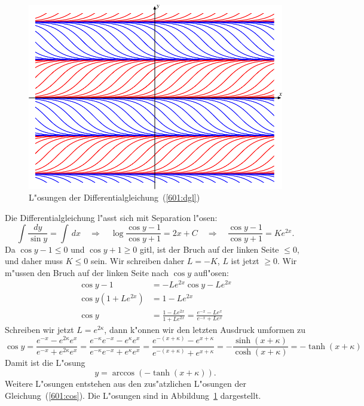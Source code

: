 \begin{diskussion}
\begin{figure}
\centering
\includegraphics{../skript/uebungsaufgaben/601-1.pdf}
\caption{L"osungen der Differentialgleichung~(\ref{601:dgl})
\label{601:bild}}
\end{figure}
Die Differentialgleichung l"asst sich mit Separation l"osen:
\[
\int \frac{dy}{\sin y}
=
\int\,dx
\quad\Rightarrow\quad
\log\frac{\cos y-1}{\cos y+1}
=
2x+C
\quad\Rightarrow\quad
\frac{\cos y-1}{\cos y+1}
=
Ke^{2x}.
\]
Da $\cos y-1\le 0$ und $\cos y +1\ge 0$ gitl, ist der Bruch auf der linken
Seite $\le 0$, und daher muss $K\le 0$ sein.
Wir schreiben daher $L=-K$, $L$ ist jetzt $\ge 0$.
Wir m"ussen den Bruch auf der linken Seite nach $\cos y$ aufl"osen:
\begin{align*}
\cos y - 1 &=-Le^{2x}\cos y -Le^{2x}
\\
\cos y(1+Le^{2x})
&=
1-Le^{2x}
\\
\cos y
&=
\frac{1-Le^{2x}}{1+Le^{2x}}
=
\frac{e^{-x}-Le^{x}}{e^{-x}+Le^x}
\end{align*}
Schreiben wir jetzt $L=e^{2\kappa}$, dann k"onnen wir den letzten
Ausdruck umformen zu
\begin{equation}
\cos y
=
\frac{e^{-x}-e^{2\kappa}e^x}{e^{-x}+e^{2\kappa}e^x}
=
\frac{e^{-\kappa}e^{-x}-e^{\kappa}e^x}{e^{-\kappa}e^{-x}+e^{\kappa}e^x}
=
\frac{e^{-(x+\kappa)}-e^{x+\kappa}}{e^{-(x+\kappa)}+e^{x + \kappa}}
=
-\frac{\sinh(x+\kappa)}{\cosh(x+\kappa)}
=
-\tanh(x+\kappa)
\label{601:cos}
\end{equation}
Damit ist die L"osung
\[
y=\arccos(-\tanh(x+\kappa)).
\]
Weitere L"osungen entstehen aus den zus"atzlichen L"osungen der
Gleichung~(\ref{601:cos}).
Die L"osungen sind in Abbildung~\ref{601:bild} dargestellt.
\end{diskussion}


